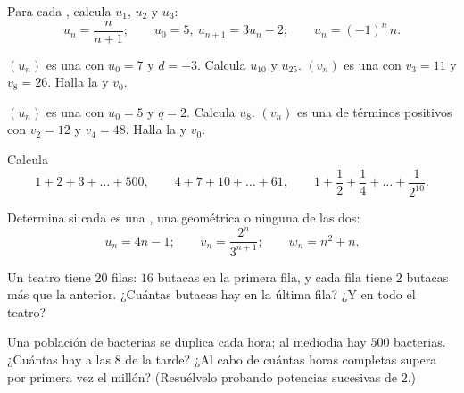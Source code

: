 \begin{exercise}[$\star$]\label{exo:g11:seq:1}
Para cada , calcula $u_1$, $u_2$ y $u_3$:
\[
u_n = \frac{n}{n+1}; \qquad
u_0 = 5,\ u_{n+1} = 3u_n - 2; \qquad
u_n = (-1)^n\,n .
\]
\end{exercise}

\begin{exercise}[$\star$]\label{exo:g11:seq:2}
$(u_n)$ es una  con $u_0 = 7$ y $d = -3$. Calcula
$u_{10}$ y $u_{25}$. $(v_n)$ es una  con $v_3 = 11$ y
$v_8 = 26$. Halla la  y $v_0$.
\end{exercise}

\begin{exercise}[$\star$]\label{exo:g11:seq:3}
$(u_n)$ es una  con $u_0 = 5$ y $q = 2$. Calcula
$u_8$. $(v_n)$ es una  de términos positivos con
$v_2 = 12$ y $v_4 = 48$. Halla la  y $v_0$.
\end{exercise}

\begin{exercise}[$\star$]\label{exo:g11:seq:4}
Calcula
\[
1 + 2 + 3 + \dots + 500, \qquad
4 + 7 + 10 + \dots + 61, \qquad
1 + \frac12 + \frac14 + \dots + \frac{1}{2^{10}} .
\]
\end{exercise}

\begin{exercise}[$\star$]\label{exo:g11:seq:5}
Determina si cada  es una , una geométrica o
ninguna de las dos:
\[
u_n = 4n - 1; \qquad
v_n = \frac{2^n}{3^{n+1}}; \qquad
w_n = n^2 + n .
\]
\end{exercise}

\begin{exercise}[$\star\star$]\label{exo:g11:seq:6}
Un teatro tiene $20$ filas: $16$ butacas en la primera fila, y cada fila
tiene $2$ butacas más que la anterior. ¿Cuántas butacas hay en la última
fila? ¿Y en todo el teatro?
\end{exercise}

\begin{exercise}[$\star\star$]\label{exo:g11:seq:7}
Una población de bacterias se duplica cada hora; al mediodía hay $500$
bacterias. ¿Cuántas hay a las 8 de la tarde? ¿Al cabo de cuántas horas
completas supera por primera vez el millón? (Resuélvelo probando potencias
sucesivas de $2$.)
\end{exercise}

